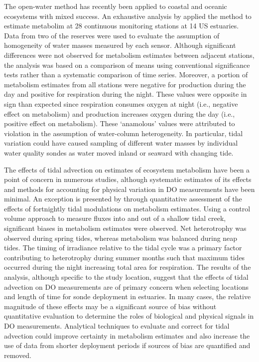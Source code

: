 The open-water method has recently been applied to coastal and oceanic ecosystems with mixed success.  An exhaustive analysis by \citet{Caffrey03} applied the method to estimate metabolim at 28 continuous monitoring stations at 14 US estuaries.  Data from two of the reserves were used to evaluate the assumption of homogeneity of water masses measured by each sensor.  Although significant differences were not observed for metabolism estimates between adjacent stations, the analysis was based on a comparison of means using conventional significance tests rather than a systematic comparison of time series.  Moreover, a portion of metabolism estimates from all stations were negative for production during the day and positive for respiration during the night.  These values were opposite in sign than expected since respiration consumes oxygen at night (i.e., negative effect on metabolism) and production increases oxygen during the day (i.e., positive effect on metabolism).  These `anamolous' values were attributed to violation in the assumption of water-column heterogeneity.  In particular, tidal variation could have caused sampling of different water masses by individual water quality sondes as water moved inland or seaward with changing tide. 

The effects of tidal advection on estimates of ecosystem metabolism have been a point of concern in numerous studies, although systematic estimates of its effects and methods for accounting for physical variation in \ac{DO} measurements have been minimal.  An exception is presented by \citet{Nidzieko14} through quantitative assessment of the effects of fortnightly tidal modulations on metabolism estimates.  Using a control volume approach to measure fluxes into and out of a shallow tidal creek, significant biases in metabolism estimates were observed.  Net heterotrophy was observed during spring tides, whereas metabolism was balanced during neap tides.  The timing of irradiance relative to the tidal cycle was a primary factor contributing to heterotrophy during summer months such that maximum tides occurred during the night increasing total area for respiration.  The results of the analysis, although specific to the study location, suggest that the effects of tidal advection on \ac{DO} measurements are of primary concern when selecting locations and length of time for sonde deployment in estuaries.  In many cases, the relative magnitude of these effects may be a significant source of bias without quantitative evaluation to determine the roles of biological and physical signals in \ac{DO} measurements. Analytical techniques to evaluate and correct for tidal advection could improve certainty in metabolism estimates and also increase the use of data from shorter deployment periods if sources of bias are quantified and removed.       

